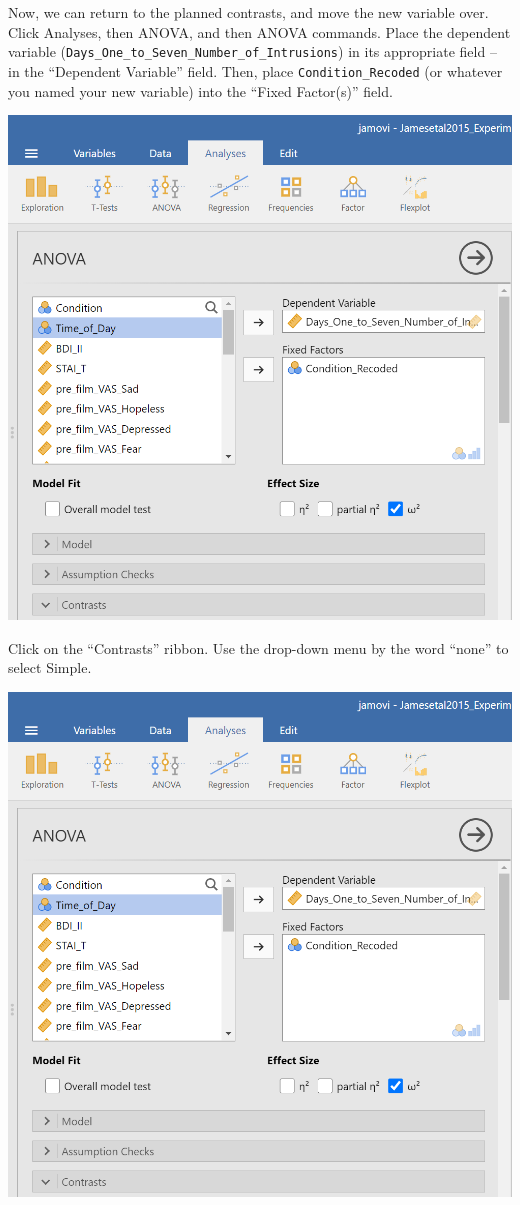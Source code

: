 \documentclass[
]{book}
\begin{document}
Now, we can return to the planned contrasts, and move the new variable over. Click {Analyses}, then {ANOVA}, and then {ANOVA} commands. Place the dependent variable (\texttt{Days\_One\_to\_Seven\_Number\_of\_Intrusions}) in its appropriate field -- in the ``Dependent Variable'' field. Then, place \texttt{Condition\_Recoded} (or whatever you named your new variable) into the ``Fixed Factor(s)'' field.

\includegraphics{img/ANOVACommandsWithRecodedCondition.png}

Click on the ``Contrasts'' ribbon. Use the drop-down menu by the word ``none'' to select Simple.

\includegraphics{img/ANOVACommandsWithRecodedCondition.png}
\end{document}
